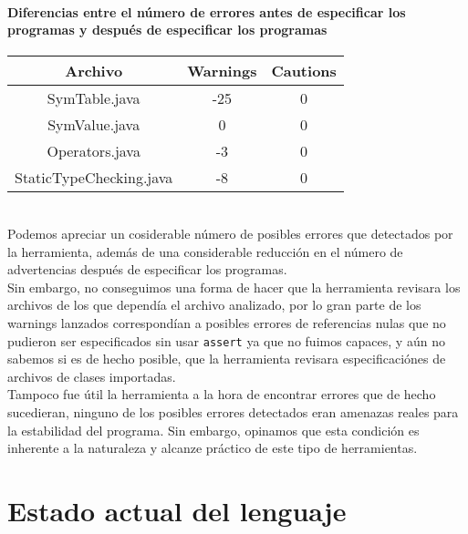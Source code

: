 \documentclass[12pt, spanish]{report}
\begin{document}
\subsubsection{Diferencias entre el n\'umero de errores antes de especificar
   los programas y despu\'es de especificar los programas}
\begin{tabular}{|c||cc|}
\hline
Archivo                 & Warnings & Cautions  \\
\hline \hline
SymTable.java           & -25 & 0 \\
SymValue.java           & 0   & 0 \\
Operators.java          & -3  & 0 \\
StaticTypeChecking.java & -8  & 0 \\
	\hline
\end{tabular}\\

Podemos apreciar un cosiderable n\'umero de posibles errores que
detectados por la herramienta, adem\'as de una considerable 
reducci\'on en el n\'umero de advertencias despu\'es de especificar los
programas.\\
\indent Sin embargo, no conseguimos una forma de hacer que la
herramienta revisara los archivos de los que depend\'ia el archivo
analizado, por lo gran parte de los warnings lanzados correspond\'ian a
posibles errores de referencias nulas que no pudieron ser
especificados sin usar \texttt{assert} ya que no fuimos
capaces, y a\'un no sabemos si es de hecho posible, que la herramienta
revisara especificaci\'ones de archivos de clases importadas.\\
\indent Tampoco fue \'util la herramienta a la hora de encontrar errores
que de hecho sucedieran, ninguno de los posibles errores detectados eran
amenazas reales para la estabilidad del programa. Sin embargo, opinamos
que esta condici\'on es inherente a la naturaleza y alcanze pr\'actico
de este tipo de herramientas. 


\chapter{Estado actual del lenguaje}
\label{chap:estado}
\end{document}
